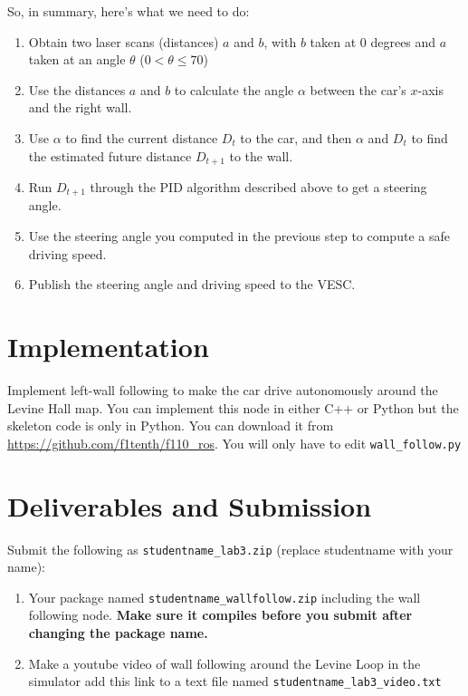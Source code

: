 \documentclass[letta4 paper]{article}
\numberwithin{equation}{section}
\newcommand{\0}{\mathbf{0}}
\begin{document}
	So, in summary, here's what we need to do:
	\begin{enumerate}
		\item Obtain two laser scans (distances) $a$ and $b$, with $b$ taken at 0 degrees and $a$ taken at an angle $\theta$ ($0 < \theta \leq 70$)
		\item Use the distances $a$ and $b$ to calculate the angle $\alpha$ between the car's $x$-axis and the right wall.
		\item Use $\alpha$ to find the current distance $D_t$ to the car, and then $\alpha$ and $D_t$ to find the estimated future distance $D_{t+1}$ to the wall.
		\item Run $D_{t+1}$ through the PID algorithm described above to get a steering angle.
		\item Use the steering angle you computed in the previous step to compute a safe driving speed.
		\item Publish the steering angle and driving speed to the VESC.
	\end{enumerate}


	\section{Implementation}
	Implement left-wall following to make the car drive autonomously around the Levine Hall map. You can implement this node in either C++ or Python but the skeleton code is only in Python. You can download it from \href{https://github.com/f1tenth/f110\_ros}{https://github.com/f1tenth/f110\_ros}. You will only have to edit \texttt{wall\_follow.py}

	

	\section{Deliverables and Submission}
	Submit the following as \texttt{studentname\_lab3.zip} (replace studentname with your name):
	
	\begin{enumerate}
		\item Your package named \texttt{studentname\_wallfollow.zip} including the wall following node. \textbf{Make sure it compiles before you submit after changing the package name.}
		\item Make a youtube video of wall following around the Levine Loop in the simulator add this link to a text file named \texttt{studentname\_lab3\_video.txt}
	\end{enumerate}
\end{document}
